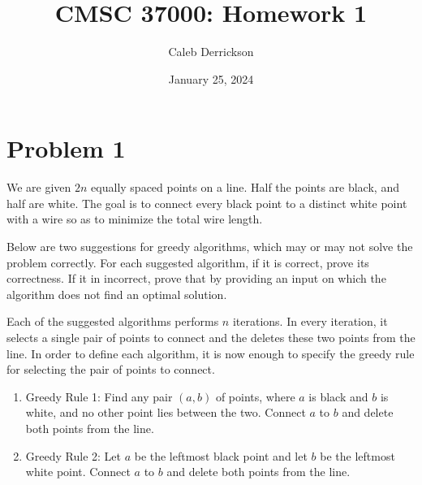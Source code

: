 

\title{CMSC 37000: Homework 1}
\author{Caleb Derrickson}
\date{January 25, 2024}


\onehalfspacing
\maketitle
\allowdisplaybreaks

\tableofcontents

\newpage
\section{Problem 1}
We are given $2n$ equally spaced points on a line. Half the points are black, and half are white. The goal is to connect every black point to a distinct white point with a wire so as to minimize the total wire length. \par
Below are two suggestions for greedy algorithms, which may or may not solve the problem correctly. For each suggested algorithm, if it is correct, prove its correctness. If it in incorrect, prove that by providing an input on which the algorithm does not find an optimal solution. \par
Each of the suggested algorithms performs $n$ iterations. In every iteration, it selects a single pair of points to connect and the deletes these two points from the line. In order to define each algorithm, it is now enough to specify the greedy rule for selecting the pair of points to connect.
\begin{enumerate}
    \item Greedy Rule 1: Find any pair $(a, b)$ of points, where $a$ is black and $b$ is white, and no other point lies between the two. Connect $a$ to $b$ and delete both points from the line.
    \item Greedy Rule 2: Let $a$ be the leftmost black point and let $b$ be the leftmost white point. Connect $a$ to $b$ and delete both points from the line. 
\end{enumerate}
\partbreak
